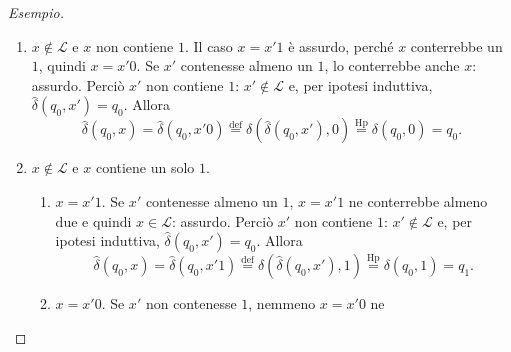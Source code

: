 \documentclass[a4paper, 11pt, oneside]{book}
\theoremstyle{formale}
\newenvironment{esempio}
    {\begin{proof}[\textit{Esempio}]\renewcommand{\qedsymbol}{$\diamond$}}
    {\end{proof}}
\begin{document}
\begin{esempio}
\begin{enumerate}
\begin{enumerate}[label=\arabic{enumi}\alph*.]
                        Se $x' \notin \mathcal{L}$, $x'$ contiene un solo $1$ e, per ipotesi
                        induttiva, $\hat{\delta}(q_0, x') = q_1$: \`e qui che serve lo
                        scorporo, perch\'e altrimenti si saprebbe solo che
                        $\hat{\delta}(q_0, x') \neq q_2$. Quindi
                        \begin{equation*}
                            \hat{\delta}(q_0, x) = \hat{\delta}(q_0, x'1)
                            \overset{\text{def}}{=} \delta(\hat{\delta}(q_0, x'), 1)
                            \overset{\text{Hp}}{=} \delta(q_1, 1) = q_2 \in \mathcal{F}.
                        \end{equation*}
                \end{enumerate}
            \item $x \notin \mathcal{L}$ e $x$ non contiene $1$. Il caso $x = x'1$ \`e
                assurdo, perch\'e $x$ conterrebbe un $1$, quindi $x = x'0$. Se $x'$
                contenesse almeno un $1$, lo conterrebbe anche $x$: assurdo. Perci\`o $x'$ non
                contiene $1$: $x' \notin \mathcal{L}$ e, per ipotesi induttiva,
                $\hat{\delta}(q_0, x') = q_0$. Allora
                \begin{equation*}
                    \hat{\delta}(q_0, x) = \hat{\delta}(q_0, x'0)
                    \overset{\text{def}}{=} \delta(\hat{\delta}(q_0, x'), 0)
                    \overset{\text{Hp}}{=} \delta(q_0, 0) = q_0.
                \end{equation*}
            \item $x \notin \mathcal{L}$ e $x$ contiene un solo $1$.
                \begin{enumerate}[label=\arabic{enumi}\alph*.]
                    \item $x = x'1$. Se $x'$ contenesse almeno un $1$, $x = x'1$ ne
                        conterrebbe almeno due e quindi $x \in \mathcal{L}$: assurdo. Perci\`o
                        $x'$ non contiene $1$: $x' \notin \mathcal{L}$ e, per ipotesi
                        induttiva, $\hat{\delta}(q_0, x') = q_0$. Allora
                        \begin{equation*}
                            \hat{\delta}(q_0, x) = \hat{\delta}(q_0, x'1)
                            \overset{\text{def}}{=} \delta(\hat{\delta}(q_0, x'), 1)
                            \overset{\text{Hp}}{=} \delta(q_0, 1) = q_1.
                        \end{equation*}
                    \item $x = x'0$. Se $x'$ non contenesse $1$, nemmeno $x = x'0$ ne

\end{enumerate}
\end{enumerate}
\end{esempio}
\end{document}

